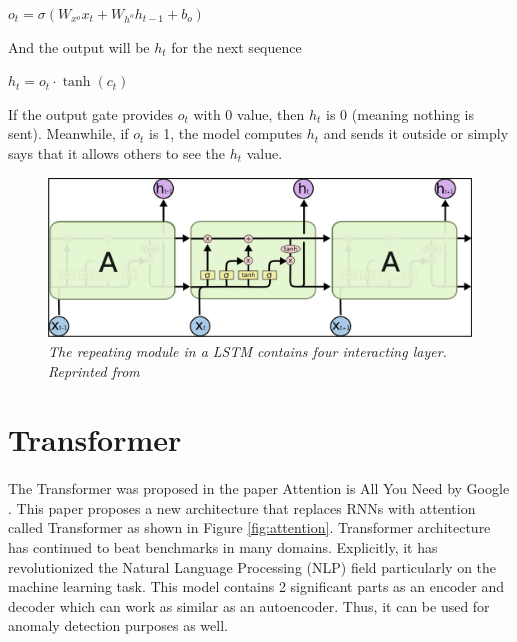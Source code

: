 \hfil $ o_t = \sigma(W_{x^o}x_t + W_{h^o}h_{t-1} + b_o) $ \par 
And the output will be $h_t$ for the next sequence

\hfil $ h_t = o_t \cdot \tanh(c_t) $ \par 
If the output gate provides $o_t$ with 0 value, then $h_t$ is 0 (meaning nothing is sent). Meanwhile, if $o_t$ is 1, the model computes $h_t$ and sends it outside or simply says that it allows others to see the $h_t$ value.

\begin{figure}[H]
  \centering
  \caption[The repeating module in a LSTM contains four interacting layer.]{\emph{The repeating module in a LSTM contains four interacting layer. \\Reprinted from \citeauthor{sirinart_tangruamsub_2017} \citeyear{sirinart_tangruamsub_2017}}}\label{fig:LSTM_2}
  \includegraphics[scale = 0.2]{figures/LSTM_2.jpg}  

\end{figure}

\section{Transformer}
\paragraph{}
The Transformer was proposed in the paper Attention is All You Need by Google \cite{vaswani_shazeer_parmar_uszkoreit_jones_n_gomez_kaiser_polosukhin_2017}. This paper proposes a new architecture that replaces RNNs with attention called Transformer as shown in Figure \ref{fig:attention}. Transformer architecture has continued to beat benchmarks in many domains. Explicitly, it has revolutionized the Natural Language Processing (NLP) field particularly on the machine learning task. This model contains 2 significant parts as an encoder and decoder which can work as similar as an autoencoder. Thus, it can be used for anomaly detection purposes as well.

